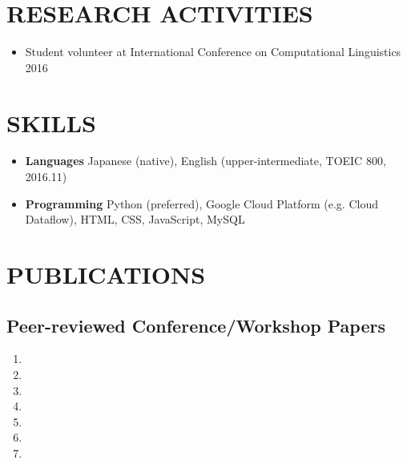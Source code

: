 \documentclass[paper=a4,fontsize=11pt]{scrartcl} %
\newcommand{\NewPart}[1]{\section*{\uppercase{#1}}}
\begin{document}
\NewPart{Research Activities}{}
\begin{itemize}[leftmargin=2em,topsep=0.5em,itemsep=0em]
    \item Student volunteer at International Conference on Computational Linguistics \hfill 2016
\end{itemize}

\NewPart{Skills}{}
\begin{itemize}[leftmargin=2em,topsep=0.5em,itemsep=0em]
    \item \textbf{Languages}\hspace{1em} Japanese (native), English (upper-intermediate, TOEIC 800, 2016.11)
    \item \textbf{Programming}\hspace{1em} Python (preferred), Google Cloud Platform (e.g. Cloud Dataflow), HTML, CSS, JavaScript, MySQL
\end{itemize}

\NewPart{Publications}{}

\subsection*{Peer-reviewed Conference/Workshop Papers}
\begin{enumerate}[leftmargin=2em,topsep=0.5em,itemsep=0em]
    \item {}
    \item {}
    \item {}
    \item {}
    \item {}
    \item {}
    \item {}
\end{enumerate}

\end{document}
